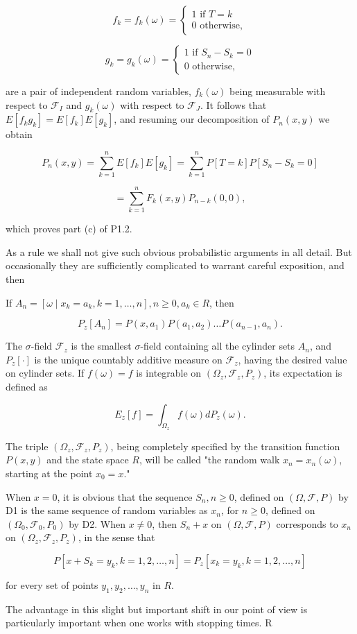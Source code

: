 $$f_k = f_k(\omega) = \begin{cases} 1 \text{ if } T = k \\ 0 \text{ otherwise}, \end{cases}$$

$$g_k = g_k(\omega) = \begin{cases} 1 \text{ if } S_n - S_k = 0 \\ 0 \text{ otherwise}, \end{cases}$$

are a pair of independent random variables, $f_k(\omega)$ being measurable with respect to $\mathcal{F}_I$ and $g_k(\omega)$ with respect to $\mathcal{F}_J$. It follows that $E[f_k g_k] = E[f_k] E[g_k]$, and resuming our decomposition of $P_n(x,y)$ we obtain

$$P_n(x,y) = \sum_{k=1}^{n} E[f_k] E[g_k] = \sum_{k=1}^{n} P[T = k] P[S_n - S_k = 0]$$

$$= \sum_{k=1}^{n} F_k(x,y) P_{n-k}(0,0),$$

which proves part (c) of P1.2.

As a rule we shall not give such obvious probabilistic arguments in all detail. But occasionally they are sufficiently complicated to warrant careful exposition, and then

If $A_n = [\omega \mid x_k = a_k, k = 1, \ldots, n], n \geq 0, a_k \in R$, then

$$P_z[A_n] = P(x, a_1)P(a_1, a_2) \ldots P(a_{n-1}, a_n).$$

The $\sigma$-field $\mathcal{F}_z$ is the smallest $\sigma$-field containing all the cylinder sets $A_n$, and $P_z[\cdot]$ is the unique countably additive measure on $\mathcal{F}_z$, having the desired value on cylinder sets. If $f(\omega) = f$ is integrable on $(\Omega_z, \mathcal{F}_z, P_z)$, its expectation is defined as

$$E_z[f] = \int_{\Omega_z} f(\omega) dP_z(\omega).$$

The triple $(\Omega_z, \mathcal{F}_z, P_z)$, being completely specified by the transition function $P(x,y)$ and the state space $R$, will be called "the random walk $x_n = x_n(\omega)$, starting at the point $x_0 = x$."

When $x = 0$, it is obvious that the sequence $S_n, n \geq 0$, defined on $(\Omega, \mathcal{F}, P)$ by D1 is the same sequence of random variables as $x_n$, for $n \geq 0$, defined on $(\Omega_0, \mathcal{F}_0, P_0)$ by D2. When $x \neq 0$, then $S_n + x$ on $(\Omega, \mathcal{F}, P)$ corresponds to $x_n$ on $(\Omega_z, \mathcal{F}_z, P_z)$, in the sense that

$$P[x + S_k = y_k, k = 1, 2, \ldots, n] = P_z[x_k = y_k, k = 1, 2, \ldots, n]$$

for every set of points $y_1, y_2, \ldots, y_n$ in $R$.

The advantage in this slight but important shift in our point of view is particularly important when one works with stopping times. R